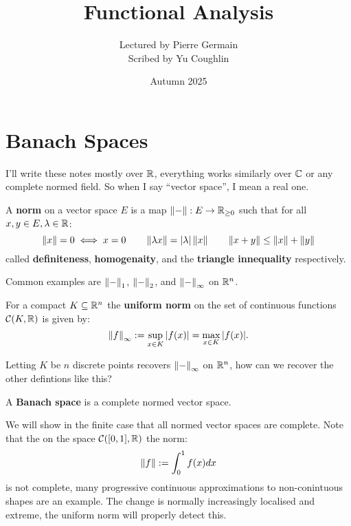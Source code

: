 \documentclass{article}
\begin{document}
\title{Functional Analysis}
\author{Lectured by Pierre Germain \\
Scribed by Yu Coughlin}
\date{Autumn 2025}

\maketitle

\tableofcontents

\section{Banach Spaces}

I'll write these notes mostly over $\mathbb{R}$, everything works similarly over $\mathbb{C}$ or any complete normed field. So when I say ``vector space'', I mean a real one.

\begin{definition}
    A \textbf{norm} on a vector space $E$ is a map $\left\lVert - \right\rVert:E\rightarrow \mathbb{R}_{\geq0}$ such that for all $x,y\in E,\lambda \in \mathbb{R}$: \[
    \left\lVert x \right\rVert=0 \iff x = 0 \qquad \left\lVert \lambda x \right\rVert=\left| \lambda \right|\left\lVert x \right\rVert \qquad \left\lVert x+y \right\rVert \leq \left\lVert x \right\rVert + \left\lVert y \right\rVert
    \] called \textbf{definiteness}, \textbf{homogenaity}, and the \textbf{triangle innequality} respectively.
\end{definition}

Common examples are $\left\lVert - \right\rVert_1$, $\left\lVert - \right\rVert_2$, and $\left\lVert - \right\rVert_\infty$ on $\mathbb{R}^n$.

\begin{definition}
    For a compact $K\subseteq \mathbb{R}^n$ the \textbf{uniform norm} on the set of continuous functions $\mathcal{C}(K,\mathbb{R})$ is given by: \[
    \left\lVert f \right\rVert_\infty := \sup_{x\in K}|f(x)| = \max_{x\in K}|f(x)|.
    \]
\end{definition}

Letting $K$ be $n$ discrete points recovers $\left\lVert - \right\rVert_\infty$ on $\mathbb{R}^n$, how can we recover the other defintions like this?

\begin{definition}
    A \textbf{Banach space} is a complete normed vector space.
\end{definition}

We will show in the finite case that all normed vector spaces are complete. Note that the on the space $\mathcal{C}([0,1],\mathbb{R})$ the norm: \[
    \left\lVert f \right\rVert := \int_0^1f(x)dx
\] is not complete, many progressive continuous approximations to non-conintuous shapes are an example. The change is normally increasingly localised and extreme, the uniform norm will properly detect this.
\end{document}
